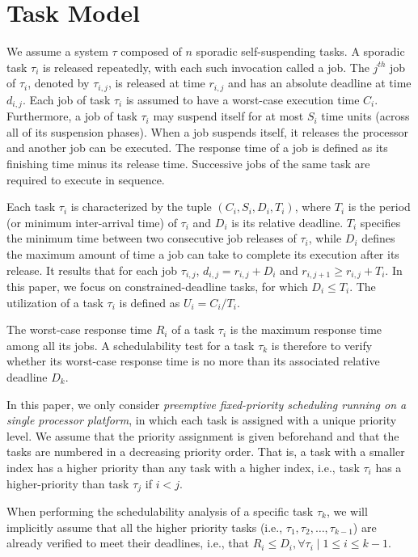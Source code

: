 \section{Task Model}


We assume a system $\tau$ composed of $n$ sporadic self-suspending tasks. A sporadic task $\tau_i$ is released repeatedly, with each such invocation called a
job. The $j^{th}$ job of $\tau_i$, denoted by $\tau_{i,j}$, is released
at time $r_{i,j}$ and has an absolute deadline at time $d_{i,j}$. Each
job of task $\tau_i$ is assumed to have a worst-case execution time $C_i$. Furthermore, a job of task $\tau_i$ may suspend itself for at most $S_i$ time units (across all of its suspension phases). When a job suspends itself, it releases the processor and another job can be executed. The response time of a job is defined as its finishing time minus its release
time. Successive jobs of the same task are required to execute in
sequence. 

Each task $\tau_i$ is characterized by the tuple $(C_i, S_i, D_i, T_i)$, where $T_i$ is the period (or minimum inter-arrival time) of $\tau_i$ and $D_i$ is its relative deadline. $T_i$ specifies the minimum time between two consecutive job releases of
$\tau_i$, while $D_i$ defines the maximum
amount of time a job can take to complete its execution after its
release. It results that for each job $\tau_{i,j}$, $d_{i,j}=r_{i,j}+D_i$ and $r_{i,j+1} \geq r_{i,j} + T_i$. In this paper, we focus on constrained-deadline tasks, for which
$D_i \leq T_i$. The utilization of a task $\tau_i$ is defined as $U_i=C_i/T_i$. 

The worst-case response
time $R_i$ of a task $\tau_i$ is the maximum response time among all its
jobs. A schedulability test for a task $\tau_k$
is therefore to verify whether its worst-case response time is no more than its associated relative deadline $D_k$.

In this paper, we only consider \emph{preemptive fixed-priority scheduling running on a single processor platform}, in
which each task is assigned with a unique priority level. We assume
that the priority assignment is given beforehand and that the tasks are numbered in a decreasing priority order. That is, a task with a smaller index has a higher priority than any task with a higher index, i.e., task $\tau_i$ has a higher-priority than task $\tau_{j}$ if $i < j$. 

When performing the schedulability analysis of a specific task $\tau_k$, we will implicitly assume that all the higher priority tasks (i.e., $\tau_1, \tau_2, \ldots, \tau_{k-1}$) are already verified to meet their deadlines, i.e., that $R_i \leq D_i, \forall \tau_i \mid 1 \leq i \leq k-1$. 




